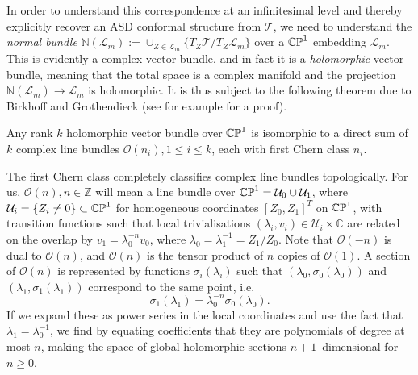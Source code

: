 In order to understand this correspondence at an infinitesimal level and thereby explicitly recover an ASD conformal structure from $\mathscr{T}$, we need to understand the \textit{normal bundle} $\mathbb{N}(\mathscr{L}_m):=\cup_{Z\in \mathscr{L}_m}\{T_Z\mathscr{T}/T_Z\mathscr{L}_m\}$ over a $\mathbb{CP}^1$ embedding $\mathscr{L}_m$. This is evidently a complex vector bundle, and in fact it is a \textit{holomorphic} vector bundle, meaning that the total space is a complex manifold and the projection $\mathbb{N}(\mathscr{L}_m)\rightarrow\mathscr{L}_m$ is holomorphic. It is thus subject to the following theorem due to Birkhoff and Grothendieck (see for example \cite{complex_mfds} for a proof).
\begin{theo}
Any rank $k$ holomorphic vector bundle over $\mathbb{CP}^1$ is isomorphic to a direct sum of $k$ complex line bundles $\mathcal{O}(n_i),1\leq i\leq k$, each with first Chern class $n_i$. 
\end{theo}

The first Chern class completely classifies complex line bundles topologically. For us, $\mathcal{O}(n),n\in\mathbb{Z}$ will mean a line bundle over $\mathbb{CP}^1=\mathcal{U}_0\cup\mathcal{U}_1$, where $\mathcal{U}_i=\{Z_i\neq 0\}\subset\mathbb{CP}^1$ for homogeneous coordinates $[Z_0,Z_1]^T$ on $\mathbb{CP}^1$, with transition functions such that local trivialisations $(\lambda_i,v_i)\in\mathcal{U}_i\times\mathbb{C}$ are related on the overlap by $v_1=\lambda_0^{-n}v_0$, where $\lambda_0=\lambda_1^{-1}=Z_1/Z_0$. Note that $\mathcal{O}(-n)$ is dual to $\mathcal{O}(n)$, and $\mathcal{O}(n)$ is the tensor product of $n$ copies of $\mathcal{O}(1)$. A section of $\mathcal{O}(n)$ is represented by functions $\sigma_i(\lambda_i)$ such that $(\lambda_0,\sigma_0(\lambda_0))$ and $(\lambda_1,\sigma_1(\lambda_1))$ correspond to the same point, i.e.
\[
\sigma_1(\lambda_1)=\lambda_0^{-n}\sigma_0(\lambda_0).
\]
If we expand these as power series in the local coordinates and use the fact that ${\lambda}_1=\lambda_0^{-1}$, we find by equating coefficients that they are polynomials of degree at most $n$, making the space of global holomorphic sections $n+1$--dimensional for $n\geq 0$.


